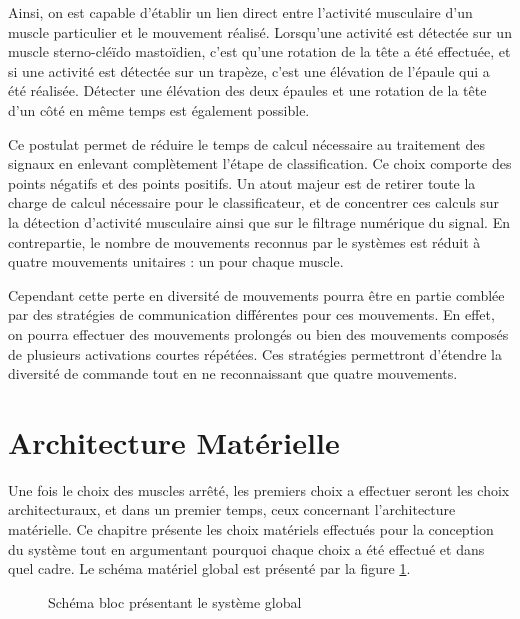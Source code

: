 \documentclass[letterpaper, twoside, 12pt, memoire, creativecommons, hyperref]{thETS}
\begin{document}
Ainsi, on est capable d'établir un lien direct entre l'activité musculaire d'un muscle particulier et le mouvement réalisé. Lorsqu'une activité est détectée sur un muscle sterno-cléïdo mastoïdien, c'est qu'une rotation de la tête a été effectuée, et si une activité est détectée sur un trapèze, c'est une élévation de l'épaule qui a été réalisée. Détecter une élévation des deux épaules et une rotation de la tête d'un côté en même temps est également possible.

Ce postulat permet de réduire le temps de calcul nécessaire au traitement des signaux en enlevant complètement l'étape de classification. Ce choix comporte des points négatifs et des points positifs. Un atout majeur est de retirer toute la charge de calcul nécessaire pour le classificateur, et de concentrer ces calculs sur la détection d'activité musculaire ainsi que sur le filtrage numérique du signal. En contrepartie, le nombre de mouvements reconnus par le systèmes est réduit à quatre mouvements unitaires : un pour chaque muscle. 

Cependant cette perte en diversité de mouvements pourra être en partie comblée par des stratégies de communication différentes pour ces mouvements. En effet, on pourra effectuer des mouvements prolongés ou bien des mouvements composés de plusieurs activations courtes répétées. Ces stratégies permettront d'étendre la diversité de commande tout en ne reconnaissant que quatre mouvements. 


\section{Architecture Matérielle}
\label{CHarchimat}

Une fois le choix des muscles arrêté, les premiers choix a effectuer seront les choix architecturaux, et dans un premier temps, ceux concernant l'architecture matérielle. Ce chapitre présente les choix matériels effectués pour la conception du système tout en argumentant pourquoi chaque choix a été effectué et dans quel cadre. Le schéma matériel global est présenté par la figure \ref{fig:archiMatTot}.

\begin{figure}
	\centering
	\caption{Schéma bloc présentant le système global}
	\label{fig:archiMatTot}
\end{figure}
\end{document}
